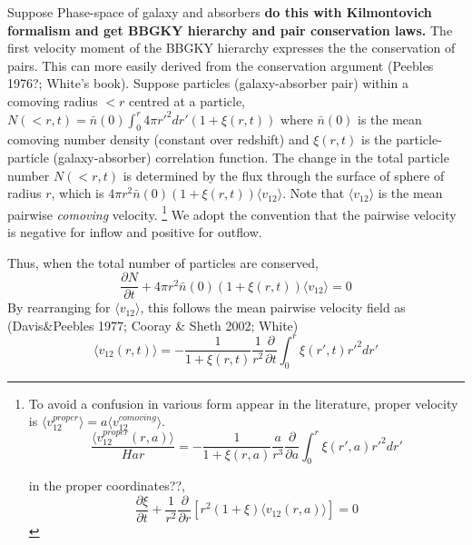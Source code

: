 \documentclass[useAMS,usenatbib,twocolumn]{mn2e}
\begin{document}
Suppose Phase-space of galaxy and absorbers \textbf{do this with 
Kilmontovich formalism and get BBGKY hierarchy and pair conservation laws.}
The first velocity moment of the BBGKY hierarchy expresses the
the conservation of pairs. This can more easily derived from the conservation
argument (Peebles 1976?; White's book). Suppose particles 
(galaxy-absorber pair) within a comoving radius $<r$ centred at a
particle, $N(<r,t)=\bar{n}(0)\int^r_0 4\pi r'^2dr'(1+\xi(r,t))$ where 
$\bar{n}(0)$ is the mean comoving number density (constant over redshift)
and $\xi(r,t)$ is the particle-particle (galaxy-absorber) correlation function.
The change in the total particle number $N(<r,t)$ is determined by the flux 
through the surface of sphere of radius $r$, which is 
$4\pi r^2\bar{n}(0)(1+\xi(r,t))\langle v_{12}\rangle$. Note that
$\langle v_{12}\rangle$ is the mean pairwise \textit{comoving} velocity.
\footnote{To avoid a confusion in various form appear in the literature,
proper velocity is $\langle v_{12}^{proper}\rangle=
a\langle v_{12}^{comoving}\rangle$.
\begin{equation}
\frac{\langle v_{12}^{proper}(r,a)\rangle}{Har}=-\frac{1}{1+\xi(r,a)}\frac{a}{r^3}
\frac{\partial}{\partial a}\int_0^r\xi(r',a)r'^2dr'
\end{equation}

 in the proper coordinates??,  
\begin{equation}
\frac{\partial \xi}{\partial t}+\frac{1}{r^2}
\frac{\partial}{\partial r}\left[r^2(1+\xi)\langle v_{12}(r,a)\rangle\right]=0
\end{equation}
}
We adopt the convention that the pairwise velocity is negative
for inflow and positive for outflow.

Thus, when the total number of particles are conserved,
\begin{equation}
\frac{\partial N}{\partial t}+
4\pi r^2\bar{n}(0)(1+\xi(r,t))\langle v_{12}\rangle=0
\end{equation}
By rearranging for $\langle v_{12}\rangle$, this follows the mean pairwise 
velocity field as (Davis\&Peebles 1977; Cooray \& Sheth 2002; White)
\begin{equation}
\langle v_{12}(r,t)\rangle=-\frac{1}{1+\xi(r,t)}\frac{1}{r^2}
\frac{\partial}{\partial t}\int_0^r\xi(r',t)r'^2dr'
\end{equation}
\end{document}
